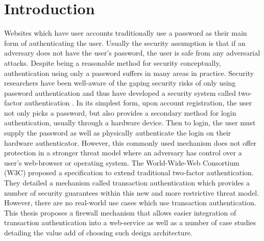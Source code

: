 \chapter{Introduction}

Websites which have user accounts traditionally use a password as their main form of authenticating the user. Usually the security assumption is that if an adversary does not have the user's password, the user is safe from any adversarial attacks. Despite being a reasonable method for security conceptually, authentication using only a password suffers in many areas in practice. Security researchers have been well-aware of the gaping security risks of only using password authentication and thus have developed a security system called two-factor authentication \cite{TODO-2FA}. In its simplest form, upon account registration, the user not only picks a password, but also provides a secondary method for login authentication, usually through a hardware device. Then to login, the user must supply the password as well as physically authenticate the login on their hardware authenticator. However, this commonly used mechanism does not offer protection in a stronger threat model where an adversary has control over a user's web-browser or operating system. The World-Wide-Web Consortium (W3C) proposed a specification to extend traditional two-factor authentication. They detailed a mechanism called transaction authentication which provides a number of security guarantees within this new and more restrictive threat model. However, there are no real-world use cases which use transaction authentication. This thesis proposes a firewall mechanism that allows easier integration of transaction authentication into a web-service as well as a number of case studies detailing the value add of choosing such design architecture.



